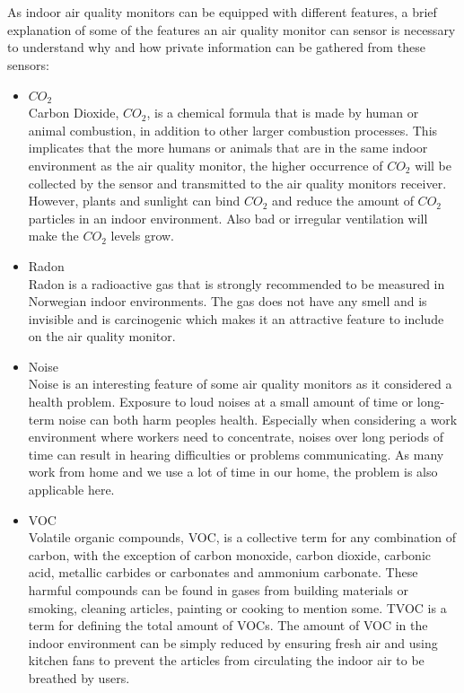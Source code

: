 \\\\
As indoor air quality monitors can be equipped with different features, a brief explanation of some of the features an air quality monitor can sensor is necessary to understand why and how private information can be gathered from these sensors:
\begin{itemize}
    \item \(CO_2\)\\
        Carbon Dioxide, \(CO_2\), is a chemical formula that is made by human or animal combustion, in addition to other larger combustion processes. \cite{CO2} This implicates that the more humans or animals that are in the same indoor environment as the air quality monitor, the higher occurrence of \(CO_2\) will be collected by the sensor and transmitted to the air quality monitors receiver. However, plants and sunlight can bind \(CO_2\) and reduce the amount of \(CO_2\) particles in an indoor environment. Also bad or irregular ventilation will make the \(CO_2\) levels grow.
    \item Radon\\
        Radon is a radioactive gas that is strongly recommended to be measured in Norwegian indoor environments. \cite{Radon} The gas does not have any smell and is invisible and is carcinogenic which makes it an attractive feature to include on the air quality monitor. 
    \item Noise\\
        Noise is an interesting feature of some air quality monitors as it considered a health problem. \cite{Noise} Exposure to loud noises at a small amount of time or long-term noise can both harm peoples health. Especially when considering a work environment where workers need to concentrate, noises over long periods of time can result in hearing difficulties or problems communicating. As many work from home and we use a lot of time in our home, the problem is also applicable here. 
    \item VOC\\
        Volatile organic compounds, VOC, is a collective term for any combination of carbon, with the exception of carbon monoxide, carbon dioxide, carbonic acid, metallic carbides or carbonates and ammonium carbonate. \cite{VOC} These harmful compounds can be found in gases from building materials or smoking, cleaning articles, painting or cooking to mention some. TVOC is a term for defining the total amount of VOCs. The amount of VOC in the indoor environment can be simply reduced by ensuring fresh air and using kitchen fans to prevent the articles from circulating the indoor air to be breathed by users. \cite{RecommendedIAQ}

\end{itemize}
